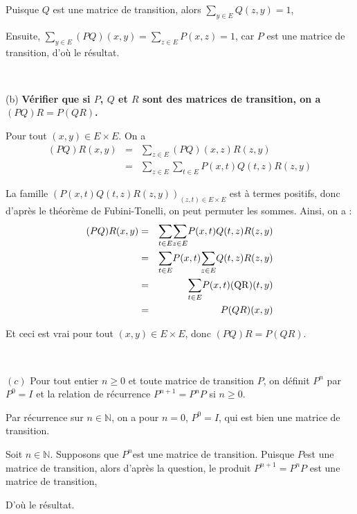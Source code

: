Puisque $Q$ est une matrice de transition, alors $\underset{y \in E}{\sum} Q
(z, y) = 1$,

Ensuite, $\underset{y \in E}{\sum} (P Q) (x, y) = \underset{z \in E}{\sum} P
(x, z) = 1$, car $P$ est une matrice de transition, d'o{\`u} le r{\'e}sultat.

\

\qquad (b) \textbf{Vérifier que si $P$, $Q$ et $R$ sont des matrices de transition, on a $(PQ)R = P(QR)$.}


Pour tout $(x, y) \in E \times E$. On a
\begin{eqnarray*}
  (P Q) R (x, y) & = & \underset{z \in E}{\sum} (P Q) (x, z) R (z, y)\\
  & = & \underset{z \in E}{\sum} \underset{t \in E}{\sum} P (x, t) Q (t, z) R
  (z, y)
\end{eqnarray*}


La famille $(P (x, t) Q (t, z) R (z, y))_{(z, t) \in E \times E}$ est {\`a}
termes positifs, donc d'apr{\`e}s le th{\'e}or{\`e}me de Fubini-Tonelli, on
peut permuter les sommes. Ainsi, on a :
\begin{eqnarray*}
  (P Q) R (x, y) & = & \underset{t \in E}{\sum} \underset{z \in E}{\sum} P (x,
  t) Q (t, z) R (z, y)\\
  & = & \underset{t \in E}{\sum} P (x, t) \underset{z \in E}{\sum} Q (t, z) R
  (z, y)\\
  & = & \underset{t \in E}{\sum} P (x, t) (\operatorname{QR}) (t, y)\\
  & = & P (Q R) (x, y)
\end{eqnarray*}


Et ceci est vrai pour tout $(x, y) \in E \times E$, donc $(P Q) R = P (Q R)$.

\

\qquad$(c)$ Pour tout entier $n \geqslant 0$ et toute matrice de transition
$P$, on d{\'e}finit $P^n$ par $P^0 = I$ et la relation de r{\'e}currence $P^{n
+ 1} = P^n P$ si $n \geqslant 0$. 

Par r{\'e}currence sur $n \in \mathbb{N}$, on a pour $n = 0$, $P^0 = I$, qui
est bien une matrice de transition.

Soit $n \in \mathbb{N}.$ Supposons que $P^n $est une matrice de transition.
Puisque $P$est une matrice de transition, alors d'apr{\`e}s la
question, le produit $P^{n + 1} = P^n P$ est une matrice de
transition,

D'o{\`u} le r{\'e}sultat.


